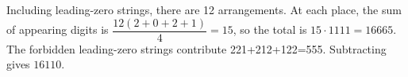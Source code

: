 Including leading-zero strings, there are 12 arrangements. At each place, the sum of appearing digits is $\dfrac{12(2+0+2+1)}{4}=15$, so the total is $15\cdot1111=16665$. The forbidden leading-zero strings contribute 221+212+122=555. Subtracting gives $\boxed{16110}$.
